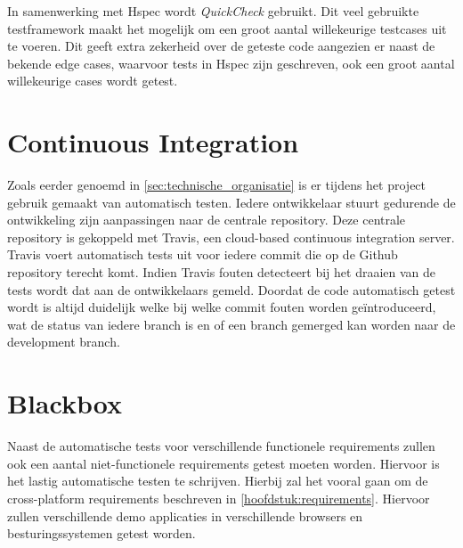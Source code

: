 In samenwerking met Hspec wordt \emph{QuickCheck}\cite{QuickCheck} gebruikt. Dit veel gebruikte testframework maakt het mogelijk om een groot aantal willekeurige testcases uit te voeren. Dit geeft extra zekerheid over de geteste code aangezien er naast de bekende edge cases, waarvoor tests in Hspec zijn geschreven, ook een groot aantal willekeurige cases wordt getest.

\section{Continuous Integration}
Zoals eerder genoemd in \autoref{sec:technische_organisatie} is er tijdens het project gebruik gemaakt van automatisch testen. Iedere ontwikkelaar stuurt gedurende de ontwikkeling zijn aanpassingen naar de centrale repository. Deze centrale repository is gekoppeld met Travis, een cloud-based continuous integration server. Travis voert automatisch tests uit voor iedere commit die op de Github repository terecht komt. Indien Travis fouten detecteert bij het draaien van de tests wordt dat aan de ontwikkelaars gemeld. Doordat de code automatisch getest wordt is altijd duidelijk welke bij welke commit fouten worden ge\"introduceerd, wat de status van iedere branch is en of een branch gemerged kan worden naar de development branch.

\section{Blackbox}
Naast de automatische tests voor verschillende functionele requirements zullen ook een aantal niet-functionele requirements getest moeten worden. Hiervoor is het lastig automatische testen te schrijven. Hierbij zal het vooral gaan om de cross-platform requirements beschreven in \autoref{hoofdstuk:requirements}. Hiervoor zullen verschillende demo applicaties in verschillende browsers en besturingssystemen getest worden.
